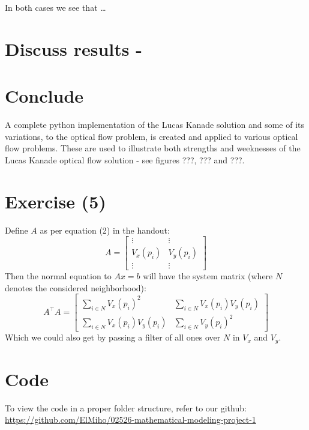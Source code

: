 \documentclass{article}
\begin{document}
In both cases we see that \dots

\section{Discuss results - }

\section{Conclude}
A complete python implementation of the Lucas Kanade solution and some of its variations, to the optical flow problem, is created and applied to various optical flow problems. These are used to illustrate both strengths and weeknesses of the Lucas Kanade optical flow solution - see figures ???, ??? and ???.





\section{Exercise (5)}
Define $A$ as per equation (2) in the handout:
\begin{equation}
    A = \begin{bmatrix}
    \vdots & \vdots \\
    V_{x}(p_i) & V_{y}(p_i) \\
    \vdots & \vdots
    \end{bmatrix}
\end{equation}
Then the normal equation to $Ax = b$ will have the system matrix (where $N$ denotes the considered neighborhood):
\begin{equation}
    A^\intercal A = \begin{bmatrix}
        \sum_{i \in N} V_{x}(p_i)^{2} & \sum_{i \in N} V_{x}(p_i)V_{y}(p_i) \\
        \sum_{i \in N} V_{x}(p_i)V_{y}(p_i) & \sum_{i \in N} V_{y}(p_i)^{2}
    \end{bmatrix}
\end{equation}
Which we could also get by passing a filter of all ones over $N$ in $V_x$ and $V_y$.

\newpage
\appendix
\section{Code}
To view the code in a proper folder structure, refer to our github: \url{https://github.com/ElMiho/02526-mathematical-modeling-project-1}
\end{document}

